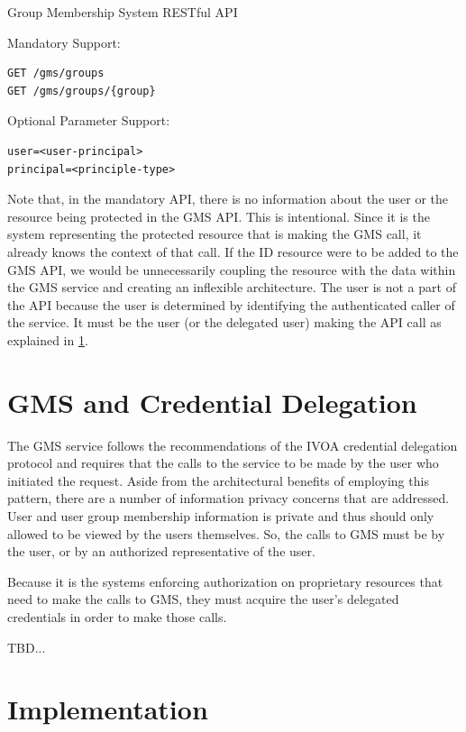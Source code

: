 \documentclass[11pt,a4paper]{ivoa}
\begin{document}
Group Membership System RESTful \citep{fielding00} API

Mandatory Support:
\begin{verbatim}
GET /gms/groups
GET /gms/groups/{group}
\end{verbatim}

Optional Parameter Support:
\begin{verbatim}
user=<user-principal>
principal=<principle-type>
\end{verbatim}

Note that, in the mandatory API, there is no information about the user or the resource being protected in the GMS API.  This is intentional.
Since it is the system representing the protected resource that is making the GMS call, it already knows the context of that call.  If the ID resource were to be added to the GMS API, we would be unnecessarily coupling the resource with the data within the GMS service and creating an inflexible architecture.
The user is not a part of the API because the user is determined by identifying the authenticated caller of the service.  It must be the user (or the delegated user) making the API call as explained in \ref{section:gmsandcdp}.

\section{GMS and Credential Delegation}
\label{section:gmsandcdp}

The GMS service follows the recommendations of the IVOA credential delegation protocol \citep{std:CDP} and requires that the calls to the service to be made by the user who initiated the request.  Aside from the architectural benefits of employing this pattern, there are a number of information privacy concerns that are addressed.  User and user group membership information is private and thus should only allowed to be viewed by the users themselves.  So, the calls to GMS must be by the user, or by an authorized representative of the user.

Because it is the systems enforcing authorization on proprietary resources that need to make the calls to GMS, they must acquire the user's delegated credentials in order to make those calls.

TBD...


\section {Implementation}
\end{document}
